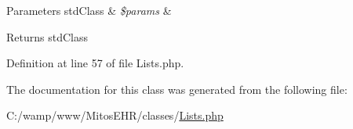 \begin{DoxyParams}[1]{\-Parameters}
std\-Class & {\em \$params} & \\
\hline
\end{DoxyParams}
\begin{DoxyReturn}{\-Returns}
std\-Class 
\end{DoxyReturn}


\-Definition at line 57 of file \-Lists.\-php.




\-The documentation for this class was generated from the following file\-:\begin{DoxyCompactItemize}
\item 
\-C\-:/wamp/www/\-Mitos\-E\-H\-R/classes/\hyperlink{_lists_8php}{\-Lists.\-php}\end{DoxyCompactItemize}
